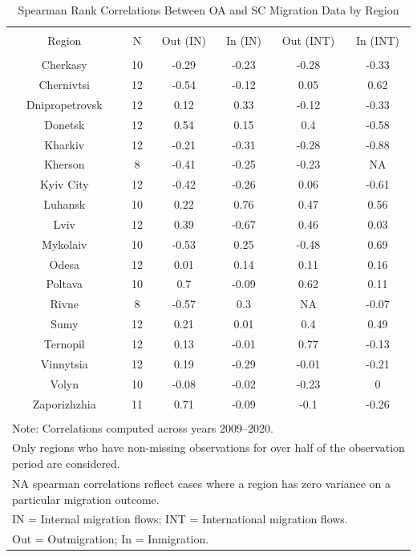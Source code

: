 
\begin{table}[!htbp] \centering 
  \caption{Spearman Rank Correlations Between OA and SC Migration Data by Region} 
  \label{tab:spearman_correlations_lagged} 
\small 
\begin{tabular}{@{\extracolsep{3pt}} cccccc} 
\\[-1.8ex]\hline 
\hline \\[-1.8ex] 
Region & N & Out (IN) & In (IN) & Out (INT) & In (INT) \\ 
\hline \\[-1.8ex] 
Cherkasy & 10 & -0.29 & -0.23 & -0.28 & -0.33 \\ 
Chernivtsi & 12 & -0.54 & -0.12 & 0.05 & 0.62 \\ 
Dnipropetrovsk & 12 & 0.12 & 0.33 & -0.12 & -0.33 \\ 
Donetsk & 12 & 0.54 & 0.15 & 0.4 & -0.58 \\ 
Kharkiv & 12 & -0.21 & -0.31 & -0.28 & -0.88 \\ 
Kherson & 8 & -0.41 & -0.25 & -0.23 & NA \\ 
Kyiv City & 12 & -0.42 & -0.26 & 0.06 & -0.61 \\ 
Luhansk & 10 & 0.22 & 0.76 & 0.47 & 0.56 \\ 
Lviv & 12 & 0.39 & -0.67 & 0.46 & 0.03 \\ 
Mykolaiv & 10 & -0.53 & 0.25 & -0.48 & 0.69 \\ 
Odesa & 12 & 0.01 & 0.14 & 0.11 & 0.16 \\ 
Poltava & 10 & 0.7 & -0.09 & 0.62 & 0.11 \\ 
Rivne & 8 & -0.57 & 0.3 & NA & -0.07 \\ 
Sumy & 12 & 0.21 & 0.01 & 0.4 & 0.49 \\ 
Ternopil & 12 & 0.13 & -0.01 & 0.77 & -0.13 \\ 
Vinnytsia & 12 & 0.19 & -0.29 & -0.01 & -0.21 \\ 
Volyn & 10 & -0.08 & -0.02 & -0.23 & 0 \\ 
Zaporizhzhia & 11 & 0.71 & -0.09 & -0.1 & -0.26 \\ 
\hline \\[-1.8ex] 
\multicolumn{6}{l}{Note: Correlations computed across years 2009--2020.} \\ 
\multicolumn{6}{l}{Only regions who have non-missing observations for over half of the observation period are considered.} \\ 
\multicolumn{6}{l}{NA spearman correlations reflect cases where a region has zero variance on a particular migration outcome.} \\ 
\multicolumn{6}{l}{IN = Internal migration flows; INT = International migration flows.} \\ 
\multicolumn{6}{l}{Out = Outmigration; In = Inmigration.} \\ 
\end{tabular} 
\end{table} 
